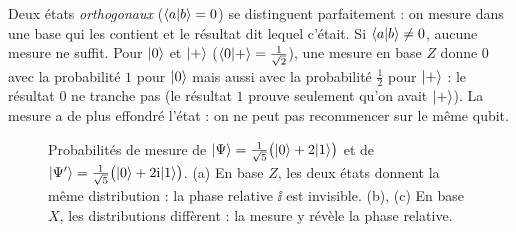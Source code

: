 \begin{remarque}\label{rem:discerner}
Deux états \emph{orthogonaux} ($\langle a|b\rangle=0$) se distinguent parfaitement : on mesure dans une
base qui les contient et le résultat dit lequel c'était. Si $\langle a|b\rangle\neq0$, aucune mesure ne
suffit. Pour $|0\rangle$ et $|+\rangle$ ($\langle 0|+\rangle=\frac{1}{\sqrt2}$), une mesure en base $Z$ donne
$0$ avec la probabilité $1$ pour $|0\rangle$ mais aussi avec la probabilité $\frac12$ pour $|+\rangle$ :
le résultat $0$ ne tranche pas (le résultat $1$ prouve seulement qu'on avait $|+\rangle$). La mesure a
de plus effondré l'état : on ne peut pas recommencer sur le même qubit.
\end{remarque}

\begin{figure}[!ht]
\centering
{}
\caption{Probabilités de mesure de $|\Psi\rangle=\frac{1}{\sqrt5}\big(|0\rangle+2|1\rangle\big)$ et de
$|\Psi'\rangle=\frac{1}{\sqrt5}\big(|0\rangle+2\mathrm{i}|1\rangle\big)$. (a) En base $Z$, les deux états donnent
la même distribution : la phase relative $\ii$ est invisible. (b), (c) En base $X$, les distributions
diffèrent : la mesure y révèle la phase relative.}
\label{fig:histo}
\end{figure}



